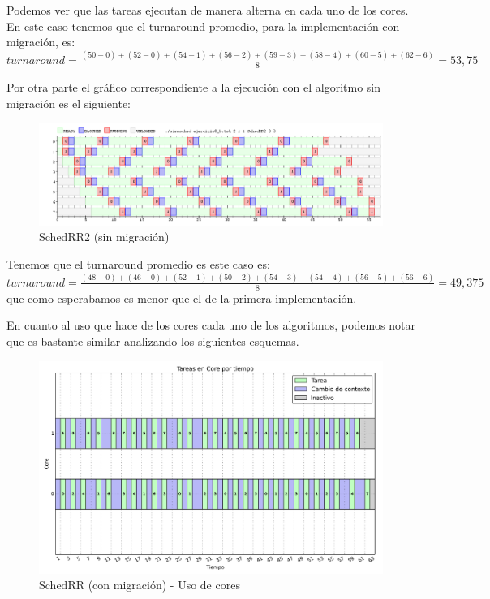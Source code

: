 \documentclass[a4paper,11pt]{article}
\begin{document}
		Podemos ver que las tareas ejecutan de manera alterna en cada uno de los cores. En este caso tenemos que el turnaround promedio, para la implementación con migración, es:\\
		
		\begin{math}
			turnaround = \frac{(50-0)+(52-0)+(54-1)+(56-2)+(59-3)+(58-4)+(60-5)+(62-6)}{8} = 53,75 
		\end{math}
		
		Por otra parte el gráfico correspondiente a la ejecución con el algoritmo sin migración es el siguiente:
		\begin{figure}[H]
		\centering
		\includegraphics[scale=.4, width=1\textwidth]{graficos/ej8-b2-2c}
		\caption{SchedRR2 (sin migración)}
		\end{figure}
		
		Tenemos que el turnaround promedio es este caso es:\\
		
		\begin{math}
			turnaround = \frac{(48-0)+(46-0)+(52-1)+(50-2)+(54-3)+(54-4)+(56-5)+(56-6)}{8} = 49,375
		\end{math}
		\\
		
		que como esperabamos es menor que el de la primera implementación.
		
		En cuanto al uso que hace de los cores cada uno de los algoritmos, podemos notar que es bastante similar analizando los siguientes esquemas.
		
		\begin{figure}[H]
		\centering
		\includegraphics[scale=.4, width=1\textwidth]{graficos/ej8-b1-2c-cores}
		\caption{SchedRR (con migración) - Uso de cores}
		\end{figure}
		
\end{document}
